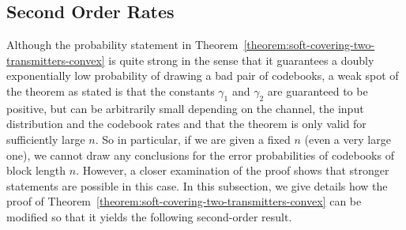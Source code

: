 \documentclass[journal]{IEEEtran}
\newcommand{\codebookBlocklength}{n}
\newcommand{\finalconstOne}{\gamma_1}
\newcommand{\finalconstTwo}{\gamma_2}
\begin{document}
\subsection{Second Order Rates}
Although the probability statement in Theorem~\ref{theorem:soft-covering-two-transmitters-convex} is quite strong in the sense that it guarantees a doubly exponentially low probability of drawing a bad pair of codebooks, a weak spot of the theorem as stated is that the constants $\finalconstOne$ and $\finalconstTwo$ are guaranteed to be positive, but can be arbitrarily small depending on the channel, the input distribution and the codebook rates and that the theorem is only valid for sufficiently large $\codebookBlocklength$. So in particular, if we are given a fixed $\codebookBlocklength$ (even a very large one), we cannot draw any conclusions for the error probabilities of codebooks of block length $\codebookBlocklength$. However, a closer examination of the proof shows that stronger statements are possible in this case. In this subsection, we give details how the proof of Theorem~\ref{theorem:soft-covering-two-transmitters-convex} can be modified so that it yields the following second-order result.
\end{document}
